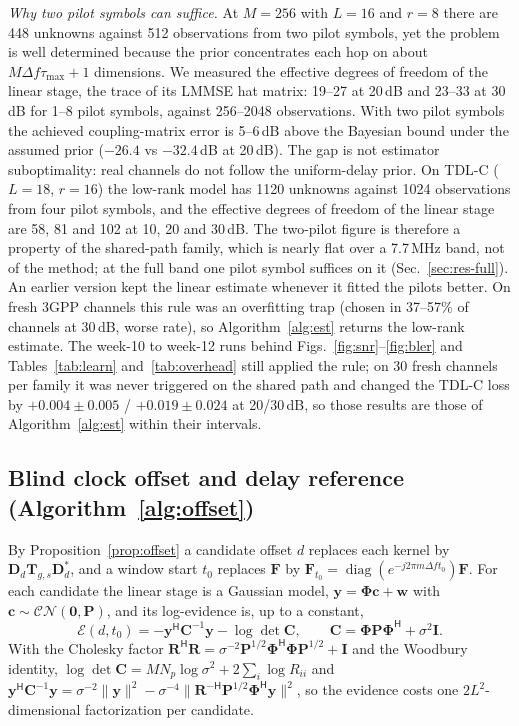 \documentclass[conference,10pt]{IEEEtran}
\theoremstyle{remark}
\DeclareMathOperator{\diag}{diag}
\newcommand{\Hm}{\mathsf H}
\begin{document}
\emph{Why two pilot symbols can suffice.} At $M=256$ with $L=16$ and $r=8$ there are 448 unknowns against 512
observations from two pilot symbols, yet the problem is well determined because the prior concentrates each hop on
about $M\Delta f\tau_{\max}+1$ dimensions. We measured the effective degrees of freedom of the linear stage, the trace of
its LMMSE hat matrix: 19--27 at 20\,dB and 23--33 at 30\,dB for 1--8 pilot symbols, against 256--2048 observations. With
two pilot symbols the achieved coupling-matrix error is 5--6\,dB above the Bayesian bound under the assumed prior
($-26.4$ vs $-32.4$\,dB at 20\,dB). The gap is not estimator suboptimality: real channels do not follow the
uniform-delay prior. On TDL-C ($L=18$, $r=16$) the low-rank model has 1120 unknowns against 1024 observations from four
pilot symbols, and the effective degrees of freedom of the linear stage are 58, 81 and 102 at 10, 20 and 30\,dB. The
two-pilot figure is therefore a property of the shared-path family, which is nearly flat over a 7.7\,MHz band, not of
the method; at the full band one pilot symbol suffices on it (Sec.~\ref{sec:res-full}). An earlier version kept the
linear estimate whenever it fitted the pilots better. On fresh 3GPP channels this rule was an overfitting trap (chosen in
37--57\% of channels at 30\,dB, worse rate), so Algorithm~\ref{alg:est} returns the low-rank estimate. The week-10 to
week-12 runs behind Figs.~\ref{fig:snr}--\ref{fig:bler} and Tables~\ref{tab:learn} and~\ref{tab:overhead} still applied the
rule; on 30 fresh channels per family it was never triggered on the shared path and changed the TDL-C loss by
$+0.004\pm0.005$ / $+0.019\pm0.024$ at 20/30\,dB, so those results are those of Algorithm~\ref{alg:est} within their
intervals.

\subsection{Blind clock offset and delay reference (Algorithm~\ref{alg:offset})}\label{sec:timing}
By Proposition~\ref{prop:offset} a candidate offset $d$ replaces each kernel by $\bm D_d\bm T_{g,s}\bm D_d^{*}$, and a
window start $t_0$ replaces $\bm F$ by $\bm F_{t_0}=\diag(e^{-j2\pi m\Delta ft_0})\bm F$. For each candidate the linear stage
is a Gaussian model, $\bm y=\bm\Phi\bm c+\bm w$ with $\bm c\sim\mathcal{CN}(\bm 0,\bm P)$, and its log-evidence is, up
to a constant,
\begin{equation}
\mathcal E(d,t_0)=-\bm y^{\Hm}\bm C^{-1}\bm y-\log\det\bm C,\qquad \bm C=\bm\Phi\bm P\bm\Phi^{\Hm}+\sigma^2\bm I.\label{eq:ev}
\end{equation}
With the Cholesky factor $\bm R^{\Hm}\bm R=\sigma^{-2}\bm P^{1/2}\bm\Phi^{\Hm}\bm\Phi\bm P^{1/2}+\bm I$ and the Woodbury
identity, $\log\det\bm C=MN_p\log\sigma^2+2\sum_i\log R_{ii}$ and
$\bm y^{\Hm}\bm C^{-1}\bm y=\sigma^{-2}\|\bm y\|^2-\sigma^{-4}\|\bm R^{-\Hm}\bm P^{1/2}\bm\Phi^{\Hm}\bm y\|^2$, so the
evidence costs one $2L^2$-dimensional factorization per candidate.
\end{document}
